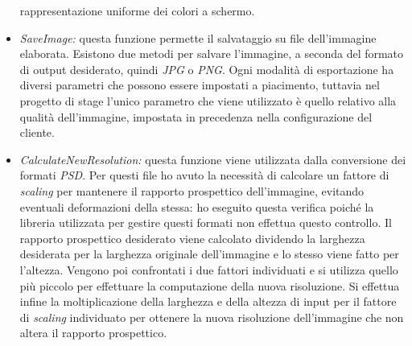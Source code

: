 \begin{itemize}
            rappresentazione uniforme dei colori a schermo.
      \item \emph{SaveImage:} questa funzione permette il salvataggio su file
            dell'immagine elaborata. Esistono due metodi per salvare l'immagine, a
            seconda del formato di output desiderato, quindi \emph{JPG} o \emph{PNG}.
            Ogni modalità di esportazione ha diversi parametri che possono essere
            impostati a piacimento, tuttavia nel progetto di stage l'unico parametro che viene
            utilizzato è quello relativo alla qualità dell'immagine, impostata in
            precedenza nella configurazione del cliente.
      \item \emph{CalculateNewResolution:} questa funzione viene utilizzata dalla
            conversione dei formati \emph{PSD}. Per questi file ho avuto la necessità di
            calcolare un fattore di \emph{scaling} per mantenere il rapporto prospettico
            dell'immagine, evitando eventuali deformazioni della stessa: ho
            eseguito questa verifica poiché la libreria utilizzata per gestire questi formati
            non effettua questo controllo.
            Il rapporto prospettico desiderato viene calcolato dividendo la larghezza desiderata per la larghezza originale
            dell'immagine e lo stesso viene fatto per l'altezza. Vengono poi confrontati
            i due fattori individuati e si utilizza quello più piccolo per effettuare la
            computazione della nuova risoluzione. Si effettua infine la moltiplicazione
            della larghezza e della altezza di input per il fattore di
            \emph{scaling} individuato per ottenere la nuova risoluzione
            dell'immagine che non altera il rapporto prospettico.
\end{itemize}
